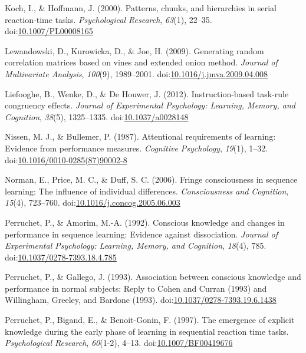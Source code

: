 \documentclass[jou]{apa6}
\theoremstyle{definition}
\theoremstyle{definition}
\theoremstyle{definition}
\theoremstyle{remark}
\begin{document}
\hypertarget{ref-koch_patterns_2000}{}
Koch, I., \& Hoffmann, J. (2000). Patterns, chunks, and hierarchies in
serial reaction-time tasks. \emph{Psychological Research}, \emph{63}(1),
22--35.
doi:\href{https://doi.org/10.1007/PL00008165}{10.1007/PL00008165}

\hypertarget{ref-lewandowski_generating_2009}{}
Lewandowski, D., Kurowicka, D., \& Joe, H. (2009). Generating random
correlation matrices based on vines and extended onion method.
\emph{Journal of Multivariate Analysis}, \emph{100}(9), 1989--2001.
doi:\href{https://doi.org/10.1016/j.jmva.2009.04.008}{10.1016/j.jmva.2009.04.008}

\hypertarget{ref-liefooghe_instruction-based_2012}{}
Liefooghe, B., Wenke, D., \& De Houwer, J. (2012). Instruction-based
task-rule congruency effects. \emph{Journal of Experimental Psychology:
Learning, Memory, and Cognition}, \emph{38}(5), 1325--1335.
doi:\href{https://doi.org/10.1037/a0028148}{10.1037/a0028148}

\hypertarget{ref-nissen_attentional_1987}{}
Nissen, M. J., \& Bullemer, P. (1987). Attentional requirements of
learning: Evidence from performance measures. \emph{Cognitive
Psychology}, \emph{19}(1), 1--32.
doi:\href{https://doi.org/10.1016/0010-0285(87)90002-8}{10.1016/0010-0285(87)90002-8}

\hypertarget{ref-norman_fringe_2006}{}
Norman, E., Price, M. C., \& Duff, S. C. (2006). Fringe consciousness in
sequence learning: The influence of individual differences.
\emph{Consciousness and Cognition}, \emph{15}(4), 723--760.
doi:\href{https://doi.org/10.1016/j.concog.2005.06.003}{10.1016/j.concog.2005.06.003}

\hypertarget{ref-perruchet_conscious_1992}{}
Perruchet, P., \& Amorim, M.-A. (1992). Conscious knowledge and changes
in performance in sequence learning: Evidence against dissociation.
\emph{Journal of Experimental Psychology: Learning, Memory, and
Cognition}, \emph{18}(4), 785.
doi:\href{https://doi.org/10.1037/0278-7393.18.4.785}{10.1037/0278-7393.18.4.785}

\hypertarget{ref-perruchet_association_1993}{}
Perruchet, P., \& Gallego, J. (1993). Association between conscious
knowledge and performance in normal subjects: Reply to Cohen and Curran
(1993) and Willingham, Greeley, and Bardone (1993).
doi:\href{https://doi.org/10.1037/0278-7393.19.6.1438}{10.1037/0278-7393.19.6.1438}

\hypertarget{ref-perruchet_emergence_1997}{}
Perruchet, P., Bigand, E., \& Benoit-Gonin, F. (1997). The emergence of
explicit knowledge during the early phase of learning in sequential
reaction time tasks. \emph{Psychological Research}, \emph{60}(1-2),
4--13. doi:\href{https://doi.org/10.1007/BF00419676}{10.1007/BF00419676}
\end{document}
